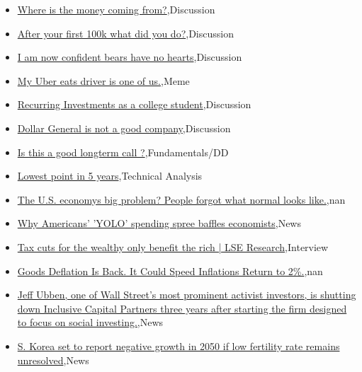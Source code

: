 \documentclass{article}%
\begin{document}
%
\begin{itemize}%
\item%
\href{https://reddit.com/r/wallstreetbets/comments/18aick5/where\_is\_the\_money\_coming\_from/}{Where is the money coming from?},Discussion%
\item%
\href{https://reddit.com/r/wallstreetbets/comments/18agqof/after\_your\_first\_100k\_what\_did\_you\_do/}{After your first 100k what did you do?},Discussion%
\item%
\href{https://reddit.com/r/wallstreetbets/comments/18ads69/i\_am\_now\_confident\_bears\_have\_no\_hearts/}{I am now confident bears have no hearts},Discussion%
\item%
\href{https://reddit.com/r/wallstreetbets/comments/18ad5d9/my\_uber\_eats\_driver\_is\_one\_of\_us/}{My Uber eats driver is one of us.},Meme%
\item%
\href{https://reddit.com/r/StockMarket/comments/18a218h/recurring\_investments\_as\_a\_college\_student/}{Recurring Investments as a college student},Discussion%
\item%
\href{https://reddit.com/r/StockMarket/comments/189v4hk/dollar\_general\_is\_not\_a\_good\_company/}{Dollar General is not a good company},Discussion%
\item%
\href{https://reddit.com/r/StockMarket/comments/189n5v1/is\_this\_a\_good\_longterm\_call/}{Is this a good longterm call ?},Fundamentals/DD%
\item%
\href{https://reddit.com/r/StockMarket/comments/1897j2d/lowest\_point\_in\_5\_years/}{Lowest point in 5 years},Technical Analysis%
\item%
\href{https://reddit.com/r/Economics/comments/18aa5v6/the\_us\_economys\_big\_problem\_people\_forgot\_what/}{The U.S. economys big problem? People forgot what normal looks like.},nan%
\item%
\href{https://reddit.com/r/Economics/comments/18a332s/why\_americans\_yolo\_spending\_spree\_baffles/}{Why Americans' 'YOLO' spending spree baffles economists},News%
\item%
\href{https://reddit.com/r/Economics/comments/18a2n0f/tax\_cuts\_for\_the\_wealthy\_only\_benefit\_the\_rich/}{Tax cuts for the wealthy only benefit the rich | LSE Research},Interview%
\item%
\href{https://reddit.com/r/Economics/comments/18a0wh1/goods\_deflation\_is\_back\_it\_could\_speed\_inflations/}{Goods Deflation Is Back. It Could Speed Inflations Return to 2\%.},nan%
\item%
\href{https://reddit.com/r/Economics/comments/189v85f/jeff\_ubben\_one\_of\_wall\_streets\_most\_prominent/}{Jeff Ubben, one of Wall Street's most prominent activist investors, is shutting down Inclusive Capital Partners three years after starting the firm designed to focus on social investing.},News%
\item%
\href{https://reddit.com/r/Economics/comments/189pbz2/s\_korea\_set\_to\_report\_negative\_growth\_in\_2050\_if/}{S. Korea set to report negative growth in 2050 if low fertility rate remains unresolved},News%
\end{itemize}%
\end{document}

